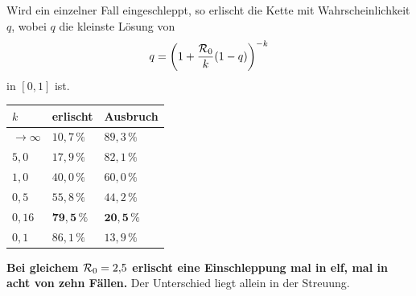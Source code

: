 \begin{merksatz}
Wird ein einzelner Fall eingeschleppt, so erlischt die Kette mit Wahrscheinlichkeit $q$, wobei $q$ die kleinste Lösung von
\[ q = \left(1 + \frac{\mathcal{R}_0}{k}(1-q)\right)^{-k} \]
in $[0,1]$ ist.

\begin{center}
{\small
\renewcommand{\arraystretch}{1.48}
\begin{tabular}{@{}P{1.8cm}P{2.4cm}P{2.6cm}@{}}
\toprule
$k$ & \textbf{erlischt} & \textbf{Ausbruch}\\
\midrule
$\to\infty$ & $10{,}7\,\%$ & $89{,}3\,\%$\\
$5{,}0$ & $17{,}9\,\%$ & $82{,}1\,\%$\\
$1{,}0$ & $40{,}0\,\%$ & $60{,}0\,\%$\\
$0{,}5$ & $55{,}8\,\%$ & $44{,}2\,\%$\\
$0{,}16$ & $\mathbf{79{,}5\,\%}$ & $\mathbf{20{,}5\,\%}$\\
$0{,}1$ & $86{,}1\,\%$ & $13{,}9\,\%$\\
\bottomrule
\end{tabular}}
\end{center}

\begin{center}
\begin{minipage}{0.9\textwidth}
\textbf{Bei gleichem $\mathcal{R}_0 = 2{,}5$ erlischt eine Einschleppung mal in elf, mal in acht von zehn Fällen.} Der Unterschied liegt allein in der Streuung.
\end{minipage}
\end{center}

\begin{center}
\begin{minipage}{0.88\textwidth}
\end{minipage}
\end{center}
\end{merksatz}

